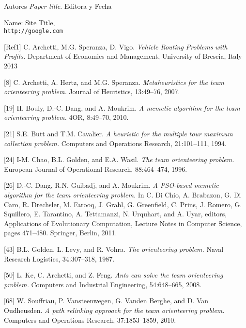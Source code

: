 \renewcommand\bibname{References}
\begin{thebibliography}{9}

Autores
\textit{Paper title}. 
Editora y Fecha
 
Name: Site Title,
\\\texttt{http://google.com}

[Ref1] C. Archetti, M.G. Speranza, D. Vigo.
\textit{Vehicle Routing Problems with Profits.} 
Department of Economics and Management, University of Brescia, Italy 2013

[8] C. Archetti, A. Hertz, and M.G. Speranza.
\textit{Metaheuristics for the team orienteering problem.} 
Journal of Heuristics, 13:49–76, 2007.

[19] H. Bouly, D.-C. Dang, and A. Moukrim.
\textit{A memetic algorithm for the team orienteering problem.}
4OR, 8:49–70, 2010.

[21] S.E. Butt and T.M. Cavalier.
\textit{A heuristic for the multiple tour maximum collection problem.}
Computers and Operations Research, 21:101–111, 1994.

[24] I-M. Chao, B.L. Golden, and E.A. Wasil.
\textit{The team orienteering problem.}
European Journal of Operational Research, 88:464–474, 1996.

[26] D.-C. Dang, R.N. Guibadj, and A. Moukrim.
\textit{A PSO-based memetic algorithm for the team orienteering problem.}
In C. Di Chio, A. Brabazon, G. Di Caro, R. Drechsler, M. Farooq, J. Grahl, G. Greenfield, C. Prins, J. Romero, G. Squillero, E. Tarantino, A. Tettamanzi, N. Urquhart, and A. Uyar, editors, Applications of Evolutionary Computation, Lecture Notes in Computer Science, pages 471–480. Springer, Berlin, 2011.

[43] B.L. Golden, L. Levy, and R. Vohra.
\textit{The orienteering problem.}
Naval Research Logistics, 34:307–318, 1987.

[50] L. Ke, C. Archetti, and Z. Feng.
\textit{Ants can solve the team orienteering problem.}
Computers and Industrial Engineering, 54:648–665, 2008.

[68] W. Souffriau, P. Vansteenwegen, G. Vanden Berghe, and D. Van Oudheusden.
\textit{A path relinking approach for the team orienteering problem.}
Computers and Operations Research, 37:1853–1859, 2010.


\end{thebibliography}
